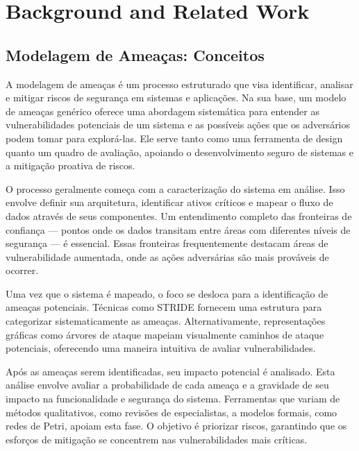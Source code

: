 
%

\chapter{Background and Related Work}
\label{cha:background}

\glsresetall

\section{Modelagem de Ameaças: Conceitos}
\label{sec:introduction}

A modelagem de ameaças é um processo estruturado que visa identificar,
analisar e mitigar riscos de segurança em sistemas e aplicações. Na sua base, um
modelo de ameaças genérico oferece uma abordagem sistemática para entender as
vulnerabilidades potenciais de um sistema e as possíveis ações que os adversários podem
tomar para explorá-las. Ele serve tanto como uma ferramenta de design quanto um
quadro de avaliação, apoiando o desenvolvimento seguro de sistemas e a mitigação
proativa de riscos.  

O processo geralmente começa com a caracterização do sistema em análise.
Isso envolve definir sua arquitetura, identificar ativos críticos e mapear o
fluxo de dados através de seus componentes. Um entendimento completo das
fronteiras de confiança — pontos onde os dados transitam entre áreas com diferentes
níveis de segurança — é essencial. Essas fronteiras frequentemente destacam áreas
de vulnerabilidade aumentada, onde as ações adversárias são mais prováveis de
ocorrer. 

Uma vez que o sistema é mapeado, o foco se desloca para a identificação de
ameaças potenciais. Técnicas como STRIDE fornecem uma estrutura para categorizar
sistematicamente as ameaças. Alternativamente, representações gráficas como árvores de
ataque mapeiam visualmente caminhos de ataque potenciais, oferecendo uma maneira
intuitiva de avaliar vulnerabilidades. 

Após as ameaças serem identificadas, seu impacto potencial é analisado.
Esta análise envolve avaliar a probabilidade de cada ameaça e a gravidade de
seu impacto na funcionalidade e segurança do sistema. Ferramentas que variam
de métodos qualitativos, como revisões de especialistas, a modelos formais,
como redes de Petri, apoiam esta fase. O objetivo é priorizar riscos,
garantindo que os esforços de mitigação se concentrem nas vulnerabilidades mais
críticas. 

